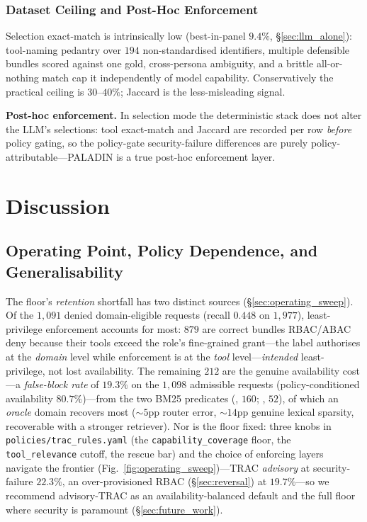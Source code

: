 \documentclass[sigconf,review,anonymous]{acmart}
\begin{document}
\subsubsection{Dataset Ceiling and Post-Hoc Enforcement}
\label{sec:ceiling}

Selection exact-match is intrinsically low (best-in-panel $9.4\%$, \S\ref{sec:llm_alone}): tool-naming pedantry over $194$ non-standardised identifiers, multiple defensible bundles scored against one gold, cross-persona ambiguity, and a brittle all-or-nothing match cap it independently of model capability. Conservatively the practical ceiling is $30$--$40\%$; Jaccard is the less-misleading signal.

\textbf{Post-hoc enforcement.} In selection mode the deterministic stack does not alter the LLM's selections: tool exact-match and Jaccard are recorded per row \emph{before} policy gating, so the policy-gate security-failure differences are purely policy-attributable---PALADIN is a true post-hoc enforcement layer.

\FloatBarrier
\section{Discussion}
\label{sec:discussion}

\subsection{Operating Point, Policy Dependence, and Generalisability}
\label{sec:deployment_envelope}
\label{sec:policy_dependence}

The floor's \emph{retention} shortfall has two distinct sources (\S\ref{sec:operating_sweep}). Of the $1{,}091$ denied domain-eligible requests (recall $0.448$ on $1{,}977$), least-privilege enforcement accounts for most: $879$ are correct bundles RBAC/ABAC deny because their tools exceed the role's fine-grained grant---the label authorises at the \emph{domain} level while enforcement is at the \emph{tool} level---\emph{intended} least-privilege, not lost availability. The remaining $212$ are the genuine availability cost---a \emph{false-block rate} of $19.3\%$ on the $1{,}098$ admissible requests (policy-conditioned availability $80.7\%$)---from the two BM25 predicates (, $160$; , $52$), of which an \emph{oracle} domain recovers most ($\sim\!5$pp router error, $\sim\!14$pp genuine lexical sparsity, recoverable with a stronger retriever). Nor is the floor fixed: three knobs in \texttt{policies/trac\_rules.yaml} (the \texttt{capability\_coverage} floor, the \texttt{tool\_relevance} cutoff, the rescue bar) and the choice of enforcing layers navigate the frontier (Fig.~\ref{fig:operating_sweep})---TRAC \emph{advisory} at security-failure $22.3\%$, an over-provisioned RBAC (\S\ref{sec:reversal}) at $19.7\%$---so we recommend advisory-TRAC as an availability-balanced default and the full floor where security is paramount (\S\ref{sec:future_work}).
\end{document}
